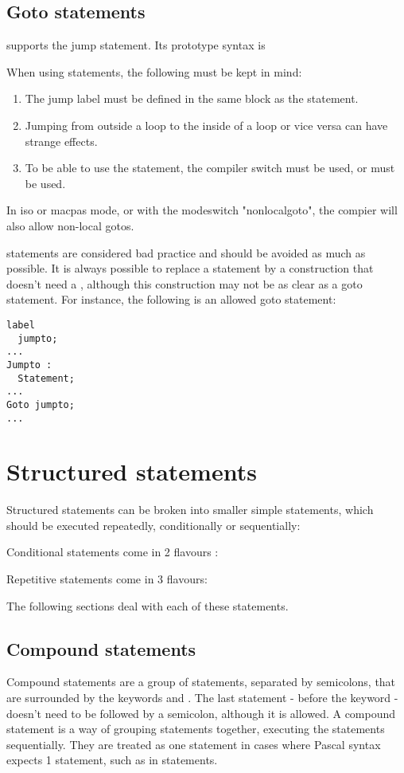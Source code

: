 \subsection{Goto statements}
\fpc supports the  jump statement. Its prototype syntax is

When using  statements, the following must be kept in mind:
\begin{enumerate}
\item The jump label must be defined in the same block as the 
statement.
\item Jumping from outside a loop to the inside of a loop or vice versa can
 have strange effects.
\item To be able to use the  statement, the  compiler
switch must be used, or  must be used.
\end{enumerate}
\begin{remark}
In iso or macpas mode, or with the modeswitch "nonlocalgoto", the compier
will also allow non-local gotos.
\end{remark}
 statements are considered bad practice and should be avoided as
much as possible. It is always possible to replace a  statement by a
construction that doesn't need a , although this construction may
not be as clear as a goto statement.
For instance, the following is an allowed goto statement:
\begin{verbatim}
label
  jumpto;
...
Jumpto :
  Statement;
...
Goto jumpto;
...
\end{verbatim}

\section{Structured statements}
Structured statements can be broken into smaller simple statements, which
should be executed repeatedly, conditionally  or sequentially:

Conditional statements come in 2 flavours :

Repetitive statements come in 3 flavours:

The following sections deal with each of these statements.

\subsection{Compound statements}
 
Compound statements are a group of statements, separated by semicolons,
that are surrounded by the keywords  and . The
last statement - before the  keyword - doesn't need to be followed by a semicolon, although it is
allowed. A compound statement is a way of grouping statements together,
executing the statements sequentially. They are treated as one statement
in cases where Pascal syntax expects 1 statement, such as in
 statements.


